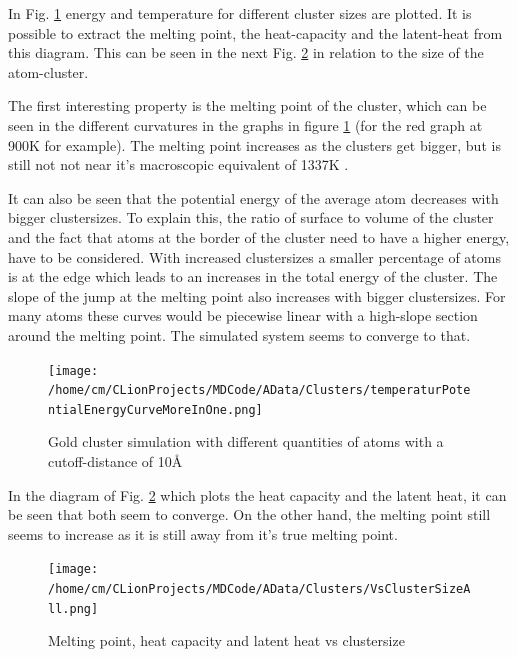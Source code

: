 \par 
In Fig.  \ref{GoldClusterSimulationTemperaturEnergy4In1} energy and temperature for different cluster sizes are plotted. It is possible to extract the melting point, the heat-capacity and the latent-heat from this diagram. This can be seen in the next Fig. \ref{GoldClusterSimulationVsClustersize} in relation to the size of the atom-cluster.
\par 
The first interesting property is the melting point of the cluster, which can be seen in the different curvatures in the graphs in figure \ref{GoldClusterSimulationTemperaturEnergy4In1} (for the red graph at 900K for example). The melting point increases as the clusters get bigger, but is still not not near it's macroscopic equivalent of 1337K \cite{Kurzweil2015}. %
\par
It can also be seen that the potential energy of the average atom decreases with bigger clustersizes. To explain this, the ratio of surface to volume of the cluster and the fact that atoms at the border of the cluster need to have a higher energy, have to be considered. With increased clustersizes a smaller percentage of atoms is at the edge which leads to an increases in the total energy of the cluster. 
The slope of the jump at the melting point also increases with bigger clustersizes. For many atoms these curves would be piecewise linear with a high-slope section around the melting point. The simulated system seems to converge to that. 

\begin{figure}
	\begin{center} 
		\texttt{[image: /home/cm/CLionProjects/MDCode/AData/Clusters/temperaturPotentialEnergyCurveMoreInOne.png]} 
	\end{center} 
	\caption[Gold cluster simulation]{Gold cluster simulation with different quantities of atoms with a cutoff-distance of 10\r{A}} 
	\label{GoldClusterSimulationTemperaturEnergy4In1} 
\end{figure} 

In the diagram of Fig. \ref{GoldClusterSimulationVsClustersize} which plots the heat capacity and the latent heat, it can be seen that both seem to converge. On the other hand, the melting point still seems to increase as it is still away from it's true melting point.

\begin{figure}
	\begin{center} 
		\texttt{[image: /home/cm/CLionProjects/MDCode/AData/Clusters/VsClusterSizeAll.png]} 
	\end{center} 
	\caption[Melting point, heat capacity and latent heat vs clustersize]{Melting point, heat capacity and latent heat vs clustersize} 
	\label{GoldClusterSimulationVsClustersize} 
\end{figure} 
